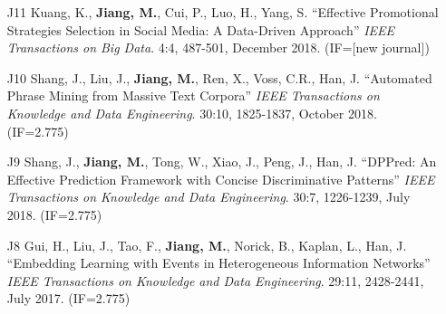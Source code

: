 \documentclass[10pt]{article}
\newenvironment{myindentpar}[1]%
{\begin{list}{}%
         {\setlength{\leftmargin}{#1}}%
         \item[]%
}
{\end{list}}
\newcounter{list}
\newcommand{\hide}[1]{}
\begin{document}
\begin{myindentpar}{0.00cm}
\begin{enumerate}[leftmargin=.5cm]
	\hide{\vspace{-0.1cm}\hspace{0.5cm}{\small \emph{I made 3\% contribution. Dr. Zhou conceived the idea, implemented the system, and completed the experiments. I joined the discussion and edited the paper.}}}

\item[J11] Kuang, K., \textbf{Jiang, M.}, Cui, P., Luo, H., Yang, S. ``Effective Promotional Strategies Selection in Social Media: A Data-Driven Approach'' \textit{IEEE Transactions on Big Data}. 4:4, 487-501, December 2018. (IF=[new journal])

	\hide{\vspace{-0.1cm}\hspace{0.5cm}{\small \emph{I made 40\% contribution. I conceived the idea and design the study. Mr. Kuang completed the experiments. Mr. Kuang and I wrote the paper.}}}

\item[J10] Shang, J., Liu, J., \textbf{Jiang, M.}, Ren, X., Voss, C.R., Han, J. ``Automated Phrase Mining from Massive Text Corpora'' \textit{IEEE Transactions on Knowledge and Data Engineering}. 30:10, 1825-1837, October 2018. (IF=2.775)

	\hide{\vspace{-0.1cm}\hspace{0.5cm}{\small \emph{I made 5\% contribution. Mr. Shang conceived the idea in consultation with myself. Mr. Shang implemented the system, completed the experiments, and wrote the paper.}}}

\item[J9] Shang, J., \textbf{Jiang, M.}, Tong, W., Xiao, J., Peng, J., Han, J. ``DPPred: An Effective Prediction Framework with Concise Discriminative Patterns'' \textit{IEEE Transactions on Knowledge and Data Engineering}. 30:7, 1226-1239, July 2018. (IF=2.775)

	\hide{\vspace{-0.1cm}\hspace{0.5cm}{\small \emph{I made 25\% contribution. Mr. Shang conceived the idea in consultation with myself. Mr. Shang implemented the system, completed the experiments, and wrote the paper.}}}

\item[J8] Gui, H., Liu, J., Tao, F., \textbf{Jiang, M.}, Norick, B., Kaplan, L., Han, J. ``Embedding Learning with Events in Heterogeneous Information Networks'' \textit{IEEE Transactions on Knowledge and Data Engineering}. 29:11, 2428-2441, July 2017. (IF=2.775)


\end{enumerate}
\end{myindentpar}
\end{document}
